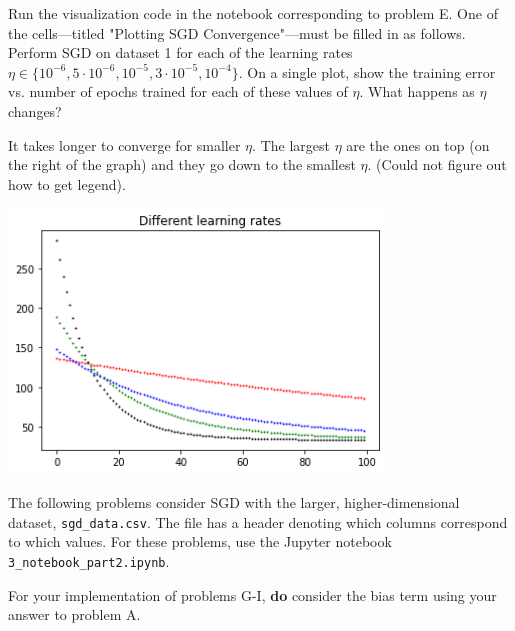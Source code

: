 \begin{problem}[6]
  Run the visualization code in the notebook corresponding to problem E. One of the cells---titled "Plotting SGD Convergence"---must be filled in as follows. Perform SGD on dataset 1 for each of the learning rates $\eta \in \{10^{-6}, 5 \cdot 10^{-6}, 10^{-5}, 3 \cdot 10^{-5}, 10^{-4}\}$. On a single plot, show the training error vs. number of epochs trained for each of these values of $\eta$. What happens as $\eta$ changes?
\end{problem}

\begin{solution}
It takes longer to converge for smaller $\eta$. The largest $\eta$ are the ones on top (on the right of the graph) and they go down to the smallest $\eta$. (Could not figure out how to get legend).

\begin{center}
    \includegraphics[width=10cm]{set1/images/eta1.png}
\end{center}
\end{solution}


The following problems consider SGD with the larger, higher-dimensional dataset, \texttt{sgd_data.csv}. The file has a header denoting which columns correspond to which values. For these problems, use the Jupyter notebook \texttt{3_notebook_part2.ipynb}.

For your implementation of problems G-I, \textbf{do} consider the bias term using your answer to problem A.


